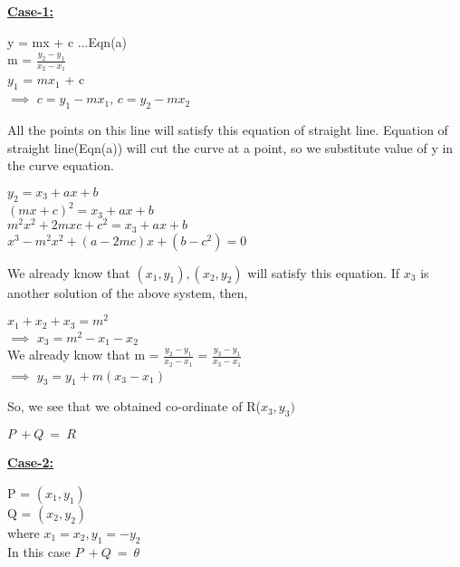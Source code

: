 \documentclass[11pt]{article}
\begin{document}
\textbf{\underline{Case-1:}}\\
\begin{center}
    y = mx + c              ...Eqn(a)\\
    \vspace{1mm}
    m = $\frac{y_2-y_1}{x_2-x_1}$\\
    \vspace{1mm}
    $y_1$ = $mx_1$ + c\\
    \vspace{1mm}
    $\implies$ $c = y_1-mx_1$, $c = y_2-mx_2$\\
\end{center}
All the points on this line will satisfy this equation of straight line. Equation of straight line(Eqn(a)) will cut the curve at a point, so we substitute value of y in the curve equation.
\begin{center}
    $y_2=x_3+ax+b$\\
    \vspace{1mm}
    ${(mx+c)}^2 = x_3+ax+b$\\
    \vspace{1mm}
    $m^2x^2+2mxc+c^2 = x_3+ax+b$\\
    \vspace{1mm}
    $x^3-m^2x^2+(a-2mc)x+(b-c^2)=0$\\
\end{center}
We already know that $(x_1,y_1),(x_2,y_2)$ will satisfy this equation. If $x_3$ is another solution of the above system, then,
\begin{center}
    $x_1+x_2+x_3=m^2$\\
    \vspace{1mm}
    $\implies$ $x_3=m^2-x_1-x_2$\\
    \vspace{3mm}
    We already know that m = $\frac{y_2-y_1}{x_2-x_1}$ = $\frac{y_3-y_1}{x_3-x_1}$\\
    \vspace{3mm}
    $\implies$ $y_3=y_1+m(x_3-x_1)$\\
\end{center}
So, we see that we obtained co-ordinate of R($x_3,y_3)$
\begin{center}
    $P \ \boxed{+} Q\ =\ R$
\end{center}
\textbf{\underline{Case-2:}}
\begin{center}
    P = $(x_1,y_1)$\\
    \vspace{1mm}
    Q = $(x_2,y_2)$\\
    \vspace{1mm}
    where $x_1=x_2, y_1=-y_2$\\
    \vspace{1mm}
    In this case $P \ \boxed{+} Q\ =\ \theta$\\
\end{center}
\end{document}

